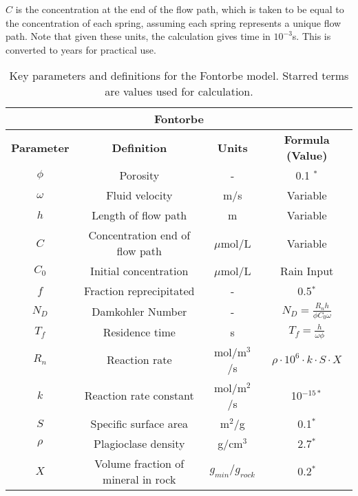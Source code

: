 \begin{tcolorbox}
{\begin{multicols}{2}
\end{multicols}
    
$C$ is the concentration at the end of the flow path, which is taken to be equal to the concentration of each spring, assuming each spring represents a unique flow path. Note that given these units, the calculation gives time in \( 10^{-3} \)s. This is converted to years for practical use.\\

\begin{table}[H]
    \centering
    \begin{tabular}{|c|c|c|c|}
        \hline
        \multicolumn{4}{|c|}{\textbf{Fontorbe}} \\  
        \hline
        \textbf{Parameter} & \textbf{Definition} & \textbf{Units} & \textbf{Formula (Value)} \\  
        \hline
        $\phi$ & Porosity & - & 0.1 $^*$\\
        $\omega$ & Fluid velocity & m/s & Variable \\
        $h$ & Length of flow path & m & Variable \\
        $C$ & Concentration \@ end of flow path & $\mu$mol/L & Variable \\
        $C_0$ & Initial concentration & $\mu$mol/L & Rain Input \\
        $f$ & Fraction reprecipitated & - & 0.5$^*$ \\
        $N_D$ & Damkohler Number & - & $N_D = \frac{R_n h}{\phi C_0 \omega}$ \\
        $T_f$ & Residence time & s & $T_f = \frac{h}{\omega\phi}$ \\
        $R_n$ & Reaction rate & mol/m$^3$/s & $\rho \cdot 10^6 \cdot k \cdot S \cdot X $ \\
        $k$ & Reaction rate constant & mol/m$^2$/s & 10$^{-15*}$ \\
        $S$ & Specific surface area & m$^2$/g & 0.1$^*$ \\
        $\rho$ & Plagioclase density & g/cm$^3$ & 2.7$^*$ \\
        $X$ & Volume fraction of mineral in rock & $g_{min}/g_{rock}$ & 0.2$^*$ \\
        \hline
    \end{tabular}
    \caption{Key parameters and definitions for the Fontorbe model. Starred terms are values used for calculation.}
    \label{tab:parameters3}
\end{table}
    
}

\end{tcolorbox}


